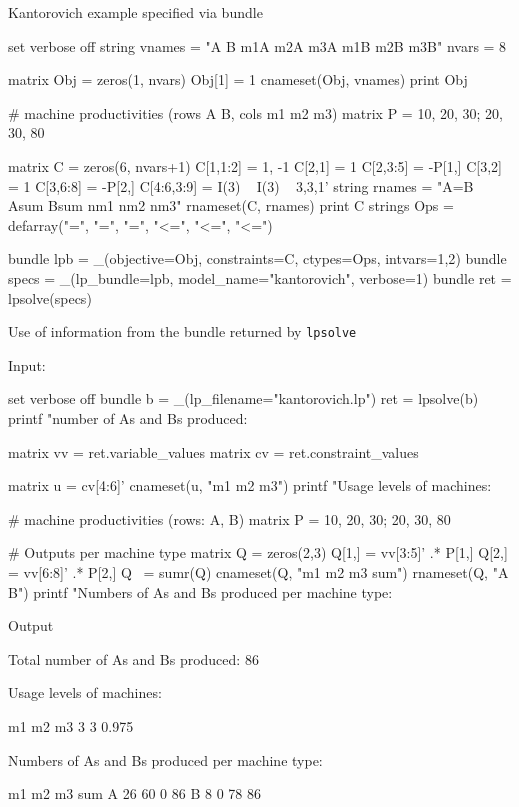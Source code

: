 \documentclass{article}
\begin{document}
\begin{script}[htbp]
  \caption{Kantorovich example specified via bundle}
  \label{ls:kantor-bundle}
\begin{scode}
set verbose off
string vnames = "A B m1A m2A m3A m1B m2B m3B"
nvars = 8

matrix Obj = zeros(1, nvars)
Obj[1] = 1
cnameset(Obj, vnames)
print Obj

# machine productivities (rows A B, cols m1 m2 m3)
matrix P = {10, 20, 30; 20, 30, 80}

matrix C = zeros(6, nvars+1)
C[1,1:2] = {1, -1}
C[2,1] = 1
C[2,3:5] = -P[1,]
C[3,2] = 1
C[3,6:8] = -P[2,]
C[4:6,3:9] = I(3) ~ I(3) ~ {3,3,1}'
string rnames = "A=B Asum Bsum nm1 nm2 nm3"
rnameset(C, rnames)
print C
strings Ops = defarray("=", "=", "=", "<=", "<=", "<=")

bundle lpb = _(objective=Obj, constraints=C, ctypes=Ops, intvars={1,2})
bundle specs = _(lp_bundle=lpb, model_name="kantorovich", verbose=1)
bundle ret = lpsolve(specs)
\end{scode}
\end{script}

\begin{script}[htbp]
  \caption{Use of information from the bundle returned by \texttt{lpsolve}}
  \label{ls:kantor-analysis}
Input:
\begin{scode}
set verbose off
bundle b = _(lp_filename="kantorovich.lp")
ret = lpsolve(b)
printf "\nTotal number of As and Bs produced: %

matrix vv = ret.variable_values
matrix cv = ret.constraint_values

matrix u = cv[4:6]'
cnameset(u, "m1 m2 m3")
printf "Usage levels of machines:\n\n%

# machine productivities (rows: A, B)
matrix P = {10, 20, 30; 20, 30, 80}

# Outputs per machine type
matrix Q = zeros(2,3)
Q[1,] = vv[3:5]' .* P[1,]
Q[2,] = vv[6:8]' .* P[2,]
Q ~= sumr(Q)
cnameset(Q, "m1 m2 m3 sum")
rnameset(Q, "A B")
printf "Numbers of As and Bs produced per machine type:\n\n%
\end{scode}
Output
\begin{scode}
Total number of As and Bs produced: 86

Usage levels of machines:

      m1      m2      m3
       3       3   0.975

Numbers of As and Bs produced per machine type:

      m1    m2    m3   sum
A     26    60     0    86
B      8     0    78    86
\end{scode}
\end{script}
\end{document}

